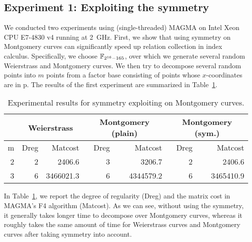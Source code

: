 \subsection{Experiment 1: Exploiting the symmetry}
%
We conducted two experiments using (single-threaded) MAGMA on Intel
Xeon CPU E7-4830 v4 running at 2~GHz.
%
First, we show that using symmetry on Montgomery curves can
significantly speed up relation collection in index calculus.
%
Specifically, we choose $\mathbb F_{2^{16} - 165}$, over which we generate
several random Weierstrass and Montgomery curves.
%
We then try to decompose several random points into $m$ points from a
factor base consisting of points whose $x$-coordinates are in \F p.
%
The results of the first experiment are summarized in
Table~\ref{tab:exp-sym}.
%
\begin{table}
  \begin{center}
    \begin{tabular}{|r||r|r|r|r|r|r|}
      \hline
      & \multicolumn{2}{c|}{Weierstrass} & \multicolumn{2}{c|}{Montgomery (plain)} & \multicolumn{2}{c|}{Montgomery (sym.)} \\ \hline\hline
      m & Dreg     & Matcost      & Dreg     & Matcost      & Dreg     & Matcost      \\ \hline
      2 & 2        & 2406.6      & 3        & 3206.7      & 2        & 2406.6      \\ \hline
      3 & 6        & 3466021.3    & 6        & 4344579.2    & 6        & 3465410.9    \\ \hline
    \end{tabular}
  \end{center}
  \caption{Experimental results for symmetry exploiting on Montgomery curves.}
  \label{tab:exp-sym}
\end{table}
%
In Table~\ref{tab:exp-sym}, we report the degree of regularity (Dreg)
and the matrix cost in MAGMA's F4 algorithm (Matcost).
%
As we can see, without using the symmetry, it generally takes longer
time to decompose over Montgomery curves, whereas it roughly takes the
same amount of time for Weierstrass curves and Montgomery curves after
taking symmetry into account.

